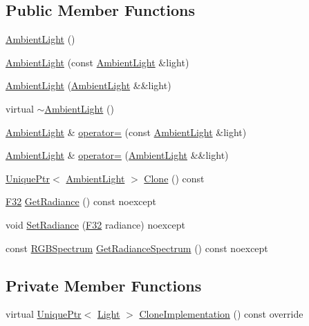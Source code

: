 \subsection*{Public Member Functions}
\begin{DoxyCompactItemize}
\item 
\hyperlink{classmage_1_1_ambient_light_a753dd42af4b6ad15b2f0867a99d6aabe}{Ambient\+Light} ()
\item 
\hyperlink{classmage_1_1_ambient_light_ac5295d1f90e64d3e59ff2856df32a187}{Ambient\+Light} (const \hyperlink{classmage_1_1_ambient_light}{Ambient\+Light} \&light)
\item 
\hyperlink{classmage_1_1_ambient_light_aab4919587032054d28ec15cf5639ad48}{Ambient\+Light} (\hyperlink{classmage_1_1_ambient_light}{Ambient\+Light} \&\&light)
\item 
virtual \hyperlink{classmage_1_1_ambient_light_a511bb794b11f112e750da09f4044e7db}{$\sim$\+Ambient\+Light} ()
\item 
\hyperlink{classmage_1_1_ambient_light}{Ambient\+Light} \& \hyperlink{classmage_1_1_ambient_light_aa8bbeaca08a626b6b5f5447a847724cc}{operator=} (const \hyperlink{classmage_1_1_ambient_light}{Ambient\+Light} \&light)
\item 
\hyperlink{classmage_1_1_ambient_light}{Ambient\+Light} \& \hyperlink{classmage_1_1_ambient_light_ae54bf8695957fb438e162a913725922a}{operator=} (\hyperlink{classmage_1_1_ambient_light}{Ambient\+Light} \&\&light)
\item 
\hyperlink{namespacemage_a3316d7143a973e37adf1110f2e80ca31}{Unique\+Ptr}$<$ \hyperlink{classmage_1_1_ambient_light}{Ambient\+Light} $>$ \hyperlink{classmage_1_1_ambient_light_a542a68882bc0807cf5f9a37391b9f44e}{Clone} () const
\item 
\hyperlink{namespacemage_aa97e833b45f06d60a0a9c4fc22ae02c0}{F32} \hyperlink{classmage_1_1_ambient_light_ab41f72d902f590ebc62ab58427e2bdab}{Get\+Radiance} () const noexcept
\item 
void \hyperlink{classmage_1_1_ambient_light_aac9a833f2261eaa1bf5eaab7608fc878}{Set\+Radiance} (\hyperlink{namespacemage_aa97e833b45f06d60a0a9c4fc22ae02c0}{F32} radiance) noexcept
\item 
const \hyperlink{structmage_1_1_r_g_b_spectrum}{R\+G\+B\+Spectrum} \hyperlink{classmage_1_1_ambient_light_a62c43af9d94835f4a59c3749ecf01e5b}{Get\+Radiance\+Spectrum} () const noexcept
\end{DoxyCompactItemize}
\subsection*{Private Member Functions}
\begin{DoxyCompactItemize}
\item 
virtual \hyperlink{namespacemage_a3316d7143a973e37adf1110f2e80ca31}{Unique\+Ptr}$<$ \hyperlink{classmage_1_1_light}{Light} $>$ \hyperlink{classmage_1_1_ambient_light_a7223a4770653c20e662810b0956c6e51}{Clone\+Implementation} () const override
\end{DoxyCompactItemize}
